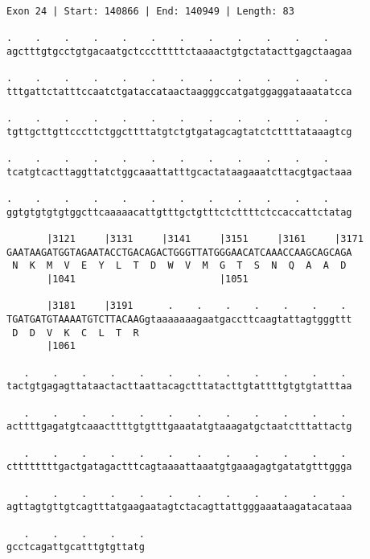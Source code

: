 \documentclass{article}
\begin{document}
\begin{Verbatim}
Exon 24 | Start: 140866 | End: 140949 | Length: 83
 
.    .    .    .    .    .    .    .    .    .    .    .    
agctttgtgcctgtgacaatgctccctttttctaaaactgtgctatacttgagctaagaa
  
.    .    .    .    .    .    .    .    .    .    .    .    
tttgattctatttccaatctgataccataactaagggccatgatggaggataaatatcca
  
.    .    .    .    .    .    .    .    .    .    .    .    
tgttgcttgttcccttctggcttttatgtctgtgatagcagtatctcttttataaagtcg
  
.    .    .    .    .    .    .    .    .    .    .    .    
tcatgtcacttaggttatctggcaaattatttgcactataagaaatcttacgtgactaaa
  
.    .    .    .    .    .    .    .    .    .    .    .    
ggtgtgtgtgtggcttcaaaaacattgtttgctgtttctcttttctccaccattctatag
  
       |3121     |3131     |3141     |3151     |3161     |3171
GAATAAGATGGTAGAATACCTGACAGACTGGGTTATGGGAACATCAAACCAAGCAGCAGA
 N  K  M  V  E  Y  L  T  D  W  V  M  G  T  S  N  Q  A  A  D 
       |1041                         |1051                  
  
       |3181     |3191      .    .    .    .    .    .    . 
TGATGATGTAAAATGTCTTACAAGgtaaaaaaagaatgaccttcaagtattagtgggttt
 D  D  V  K  C  L  T  R                                     
       |1061                                                
  
   .    .    .    .    .    .    .    .    .    .    .    . 
tactgtgagagttataactacttaattacagctttatacttgtattttgtgtgtatttaa
  
   .    .    .    .    .    .    .    .    .    .    .    . 
acttttgagatgtcaaacttttgtgtttgaaatatgtaaagatgctaatctttattactg
  
   .    .    .    .    .    .    .    .    .    .    .    . 
cttttttttgactgatagactttcagtaaaattaaatgtgaaagagtgatatgtttggga
  
   .    .    .    .    .    .    .    .    .    .    .    . 
agttagtgttgtcagtttatgaagaatagtctacagttattgggaaataagatacataaa
  
   .    .    .    .    .
gcctcagattgcatttgtgttatg
\end{Verbatim}
\newpage
\end{document}
